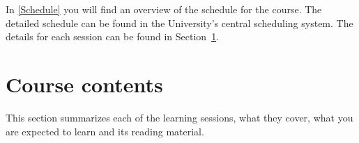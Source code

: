 In \cref{Schedule} you will find an overview of the schedule for the course.
The detailed schedule can be found in the University's central scheduling 
system.
The details for each session can be found in Section~\ref{CourseContents}.

\begin{frame}[allowframebreaks]

\end{frame}


\section{Course contents}%
\label{CourseContents}

This section summarizes each of the learning sessions, \ie what they cover, 
what you are expected to learn and its reading material.


